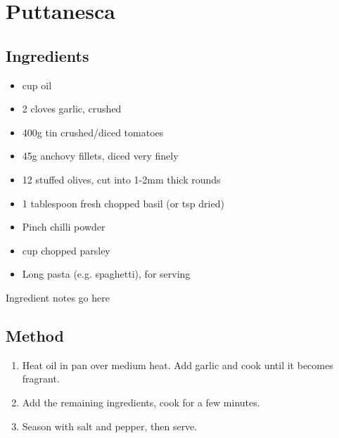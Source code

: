\section{Puttanesca}


\subsection{Ingredients}

\begin{itemize}
    \item {} cup oil
    \item 2 cloves garlic, crushed
    \item 400g tin crushed/diced tomatoes
    \item 45g anchovy fillets, diced very finely
    \item 12 stuffed olives, cut into 1-2mm thick rounds
    \item 1 tablespoon fresh chopped basil (or  tsp dried)
    \item Pinch chilli powder
    \item {} cup chopped parsley
    \item Long pasta (e.g. spaghetti), for serving
\end{itemize}

Ingredient notes go here

\subsection{Method}

\begin{enumerate}
    \item Heat oil in pan over medium heat. Add garlic and cook until it becomes fragrant.
    \item Add the remaining ingredients, cook for a few minutes.
    \item Season with salt and pepper, then serve.
\end{enumerate}

